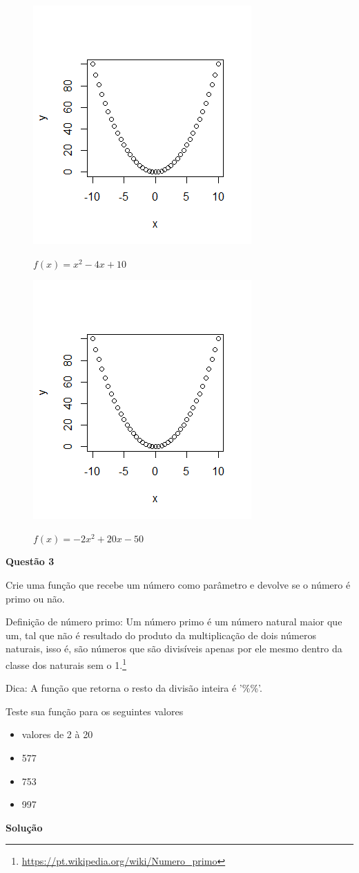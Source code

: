 \documentclass[12pt, a4paper]{article}
\begin{document}
\begin{figure}[H]
	\caption{$f(x) = x^2 - 4x + 10$}
	\centering
	\includegraphics[scale=1]{images/function1.png}
	\label{fig:function3}
\end{figure}


\begin{figure}[H]
	\caption{$f(x) = -2x^2 + 20x - 50$}
	\centering
	\includegraphics[scale=1]{images/function1.png}
	\label{fig:function4}
\end{figure}




\textbf{Questão 3}

Crie uma função que recebe um número como parâmetro e devolve se o número é primo ou não.

Definição de número primo: Um número primo é um número natural maior que um, tal que não é resultado do produto da multiplicação de dois números naturais, isso é, são números que são divisíveis apenas por ele mesmo dentro da classe dos naturais sem o 1.\footnote{\url{https://pt.wikipedia.org/wiki/Numero_primo}}

Dica: A função que retorna o resto da divisão inteira é '\%\%'.

Teste sua função para os seguintes valores

\begin{itemize}
	\item valores de 2 à 20
	\item 577
	\item 753
	\item 997
\end{itemize}



\textbf{Solução}



	
\end{document}
